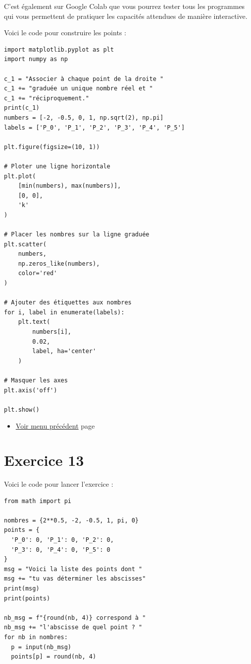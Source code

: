 \documentclass[a4paper,11pt]{book}
\begin{document}
C'est également sur Google Colab que vous pourrez tester tous les
programmes qui vous permettent de pratiquer les capacités attendues
de manière interactive.

Voici le code pour construire les points :

\clearpage

\begin{verbatim}
import matplotlib.pyplot as plt
import numpy as np

c_1 = "Associer à chaque point de la droite "
c_1 += "graduée un unique nombre réel et "
c_1 += "réciproquement."
print(c_1)
numbers = [-2, -0.5, 0, 1, np.sqrt(2), np.pi]
labels = ['P_0', 'P_1', 'P_2', 'P_3', 'P_4', 'P_5']

plt.figure(figsize=(10, 1))

# Ploter une ligne horizontale
plt.plot(
    [min(numbers), max(numbers)],
    [0, 0],
    'k'
)

# Placer les nombres sur la ligne graduée
plt.scatter(
    numbers,
    np.zeros_like(numbers),
    color='red'
)

# Ajouter des étiquettes aux nombres
for i, label in enumerate(labels):
    plt.text(
        numbers[i],
        0.02,
        label, ha='center'
    )

# Masquer les axes
plt.axis('off')

plt.show()
\end{verbatim}

\begin{itemize}
\item \hyperref[orgccf1b93]{Voir menu précédent}
page~\pageref{page:capacity1-menu}
\end{itemize}


\clearpage


\section{Exercice 13}
\label{sec:orgfa7ff04}
\label{org6da0729}
\label{page:sec3.2.2exo13}

Voici le code pour lancer l'exercice :

\begin{verbatim}
from math import pi

nombres = {2**0.5, -2, -0.5, 1, pi, 0}
points = {
  'P_0': 0, 'P_1': 0, 'P_2': 0,
  'P_3': 0, 'P_4': 0, 'P_5': 0
}
msg = "Voici la liste des points dont "
msg += "tu vas déterminer les abscisses"
print(msg)
print(points)

nb_msg = f"{round(nb, 4)} correspond à "
nb_msg += "l'abscisse de quel point ? "
for nb in nombres:
  p = input(nb_msg)
  points[p] = round(nb, 4)
\end{verbatim}
\end{document}
